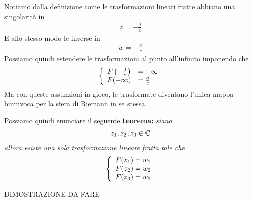 Notiamo dalla definizione come le trasformazioni lineari fratte abbiano una singolarità in
\begin{align}
	z = -\frac{d}{c}
\end{align}
E allo stesso modo le inverse in
\begin{align}
	w = +\frac{a}{c}
\end{align}
Possiamo quindi estendere le trasformazioni al punto all'infinito imponendo che
\begin{align}
	\double{F \left( -\frac{d}{c} \right) &=+\infty \hfill}{F(+\infty) &= \frac{a}{c} \hfill}
\end{align}
Ma con queste assunzioni in gioco, le trasformate diventano l'unica mappa biunivoca per la sfera di Riemann in se stessa. 

Possiamo quindi enunciare il seguente \textbf{teorema:} \textit{siano 
\begin{align}
	z_1,z_2,z_3\in \mathbb{C}
\end{align}
allora esiste una sola trasformazione lineare fratta tale che}
\begin{align}
	\left\{ \begin{array}{ccc} F(z_1) = w_1\\ F(z_2) = w_2\\ F(z_3) = w_3 \end{array} \right.
\end{align}

DIMOSTRAZIONE DA FARE

\newpage

